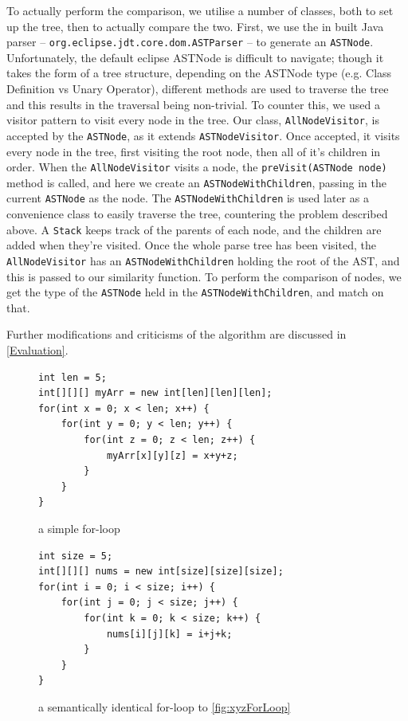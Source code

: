To actually perform 
the comparison, we utilise a number of classes, both to set up the tree, then to actually
compare the two. First, we use the in built Java parser -- \texttt{org.eclipse.jdt.core.dom.ASTParser}
-- to generate an \texttt{ASTNode}. Unfortunately, the default eclipse ASTNode is difficult
to navigate; though it takes the form of a tree structure, depending on the ASTNode 
type (e.g. Class Definition vs Unary Operator), different methods are used to traverse
the tree and this results in the traversal being non-trivial. To counter this, we
used a visitor pattern to visit every node in the tree. Our class, \texttt{AllNodeVisitor},
is accepted by the \texttt{ASTNode}, as it extends \texttt{ASTNodeVisitor}. Once accepted, it visits
every node in the tree, first visiting the root node, then all of it's children in 
order. When the \texttt{AllNodeVisitor} visits a node, the 
\texttt{preVisit(ASTNode node)} method is called, and here we
create an \texttt{ASTNodeWithChildren}, passing in the current \texttt{ASTNode} as the node. The 
\texttt{ASTNodeWithChildren} is used later as a convenience class to easily traverse
the tree, countering the problem described above. A \texttt{Stack} keeps track
of the parents of each node, and the children are added when they're visited.
Once the whole parse tree has been visited, the \texttt{AllNodeVisitor} has an 
\texttt{ASTNodeWithChildren} holding the root of the AST, and this is passed to
our similarity function.
To perform the comparison of nodes, we get the type of the \texttt{ASTNode} held
in the \texttt{ASTNodeWithChildren}, and match on that.

Further modifications and criticisms of the algorithm are discussed in \cref{Evaluation}.

\begin{figure}
\begin{minipage}[b]{0.45\linewidth}
\begin{lstlisting}
int len = 5;
int[][][] myArr = new int[len][len][len];
for(int x = 0; x < len; x++) {
	for(int y = 0; y < len; y++) {
		for(int z = 0; z < len; z++) {
			myArr[x][y][z] = x+y+z;
		}
	}
}
\end{lstlisting}
\caption{a simple for-loop}
\label{fig:xyzForLoop}
\end{minipage}
\hspace{0.5cm}
\begin{minipage}[b]{0.45\linewidth}
\begin{lstlisting}
int size = 5;
int[][][] nums = new int[size][size][size];
for(int i = 0; i < size; i++) {
	for(int j = 0; j < size; j++) {
		for(int k = 0; k < size; k++) {
			nums[i][j][k] = i+j+k;
		}
	}
}
\end{lstlisting}
\caption{a semantically identical for-loop to \ref{fig:xyzForLoop}}
\label{fig:ijkForLoop}
\end{minipage}
\end{figure}

